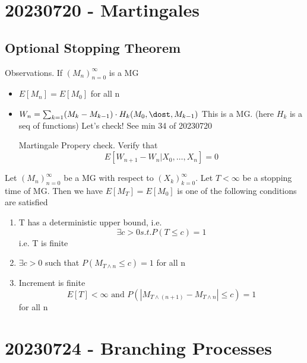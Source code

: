 \documentclass{report}
\begin{document}
\chapter{20230720 - Martingales}%
  \section{Optional Stopping Theorem}%
  Observations.  If $(M_n)^{\infty}_{n=0}$ is a MG
  \begin{itemize}
    \item $E[M_n] = E[M_0]$ for all n
    \item $W_n = \sum^{}_{k=1} (M_k - M_{k-1}) \cdot H_k(M_0, \dost, M_{k-1})$
      This is a MG.  (here $H_k$ is a seq of functions)
      Let's check!  See min 34 of 20230720

      Martingale Propery check.  Verify that
      \[ E[W_{n+1} - W_n | X_0, \dots, X_n ] = 0 \]
  \end{itemize}
   {
    Let $(M_n)^{\infty}_{n=0}$ be a MG with respect to 
    $(X_k)^{\infty}_{k=0}$.  Let $T < \infty$ be a stopping time of MG.
    Then we have $E[M_T] = E[M_0]$ is one of the following conditions
    are satisfied
    \begin{enumerate}
      \item T has a deterministic upper bound, i.e.
        \[ \exists c > 0 s.t. P(T \leq c) = 1 \]
        i.e. T is finite
      \item $\exists c > 0$ such that $P(M_{T \wedge n} \leq c) = 1$
        for all n
      \item Increment is finite
        \[ E[T] < \infty \text{ and } P(|M_{T \wedge(n+1)} - M_{T \wedge n} | \leq c) = 1   \]
          for all n
    \end{enumerate}
  }
   {
    
  }
  
\chapter{20230724 - Branching Processes}%
\end{document}
